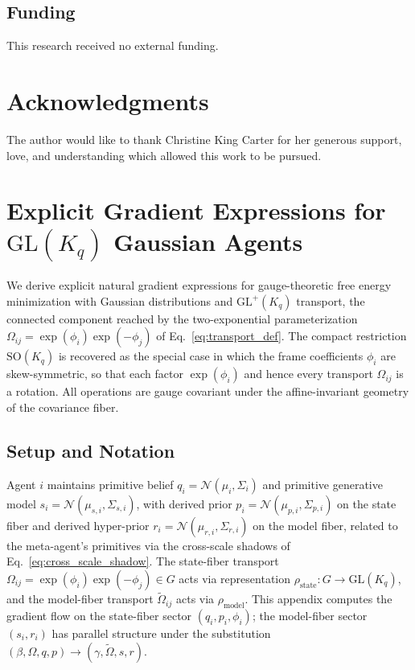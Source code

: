 \documentclass[11pt]{article}
\newenvironment{acknowledgments}
  {\section*{Acknowledgments}}
  {}
\begin{document}
\subsection*{Funding}
This research received no external funding.

\begin{acknowledgments}
The author would like to thank Christine King Carter for her generous support, love, and understanding which allowed this work to be pursued.
\end{acknowledgments}

\appendix

\section{Explicit Gradient Expressions for $\mathrm{GL}(K_q)$ Gaussian Agents}\label{app:gradients}

We derive explicit natural gradient expressions for gauge-theoretic free energy minimization with Gaussian distributions and $\mathrm{GL}^+(K_q)$ transport, the connected component reached by the two-exponential parameterization $\Omega_{ij} = \exp(\phi_i)\exp(-\phi_j)$ of Eq.~\eqref{eq:transport_def}. The compact restriction $\mathrm{SO}(K_q)$ is recovered as the special case in which the frame coefficients $\phi_i$ are skew-symmetric, so that each factor $\exp(\phi_i)$ and hence every transport $\Omega_{ij}$ is a rotation. All operations are gauge covariant under the affine-invariant geometry of the covariance fiber.

\subsection*{Setup and Notation}

Agent $i$ maintains primitive belief $q_i = \mathcal{N}(\mu_i, \Sigma_i)$ and primitive generative model $s_i = \mathcal{N}(\mu_{s,i}, \Sigma_{s,i})$, with derived prior $p_i = \mathcal{N}(\mu_{p,i}, \Sigma_{p,i})$ on the state fiber and derived hyper-prior $r_i = \mathcal{N}(\mu_{r,i}, \Sigma_{r,i})$ on the model fiber, related to the meta-agent's primitives via the cross-scale shadows of Eq.~\eqref{eq:cross_scale_shadow}. The state-fiber transport $\Omega_{ij} = \exp(\phi_i)\exp(-\phi_j) \in G$ acts via representation $\rho_{\mathrm{state}}: G \to \mathrm{GL}(K_q)$, and the model-fiber transport $\tilde\Omega_{ij}$ acts via $\rho_{\mathrm{model}}$. This appendix computes the gradient flow on the state-fiber sector $(q_i, p_i, \phi_i)$; the model-fiber sector $(s_i, r_i)$ has parallel structure under the substitution $(\beta, \Omega, q, p) \to (\gamma, \tilde\Omega, s, r)$.
\end{document}
